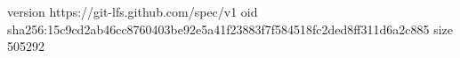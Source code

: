 version https://git-lfs.github.com/spec/v1
oid sha256:15c9cd2ab46cc8760403be92e5a41f23883f7f584518fc2ded8ff311d6a2c885
size 505292
